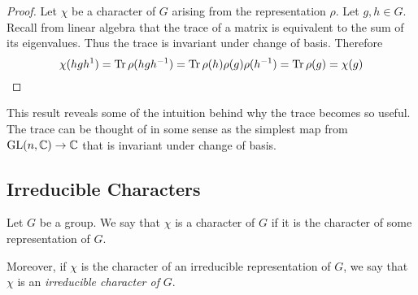 \begin{proof}
    Let $\chi$ be a character of $G$ arising from the representation $\rho$. Let $g, h \in G$. Recall from linear 
    algebra that the trace of a matrix is equivalent to the sum of its eigenvalues.  Thus the trace is invariant 
    under change of basis. Therefore
    \[
        \chi(hgh^{1}) = \text{Tr}\, \rho(hgh^{-1}) = \text{Tr}\, \rho(h) \rho(g)\rho(h^{-1}) = \text{Tr}\, \rho(g) = \chi(g)
    \]
\end{proof}

This result reveals some of the intuition behind why the trace becomes so useful. The trace can be thought of in 
some sense as the simplest map from $\operatorname{GL}(n, \mathbb{C}) \rightarrow \mathbb{C}$ that is invariant under change of basis. 









\subsection{Irreducible Characters}

\begin{definition}
    Let $G$ be a group. We say that $\chi$ is a character of $G$ if it is the character of some representation of 
    $G$.

    Moreover, if $\chi$ is the character of an irreducible representation of $G$, we say that $\chi$ is an
    \emph{irreducible character of} $G$.
\end{definition}

